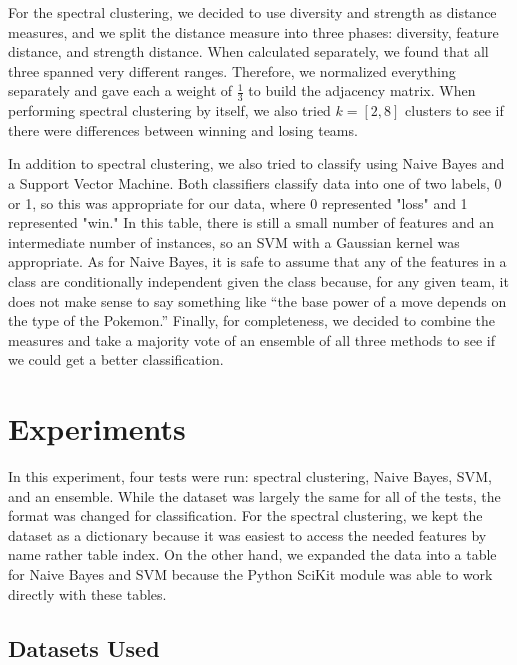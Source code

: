 \documentclass{acm_proc_article-sp}
\begin{document}
For the spectral clustering, we decided to use diversity and strength as distance measures, and we split the distance measure into three phases: diversity, feature distance, and strength distance. When calculated separately, we found that all three spanned very different ranges. Therefore, we normalized everything separately and gave each a weight of $\frac{1}{3}$ to build the adjacency matrix. When performing spectral clustering by itself, we also tried $k=[2, 8]$ clusters to see if there were differences between winning and losing teams.

In addition to spectral clustering, we also tried to classify using Naive Bayes and a Support Vector Machine. Both classifiers classify data into one of two labels, 0 or 1, so this was appropriate for our data, where 0 represented "loss" and 1 represented "win." In this table, there is still a small number of features and an intermediate number of instances, so an SVM with a Gaussian kernel was appropriate. As for Naive Bayes, it is safe to assume that any of the features in a class are conditionally independent given the class because, for any given team, it does not make sense to say something like “the base power of a move depends on the type of the Pokemon.” Finally, for completeness, we decided to combine the measures and take a majority vote of an ensemble of all three methods to see if we could get a better classification.

\section{Experiments}

In this experiment, four tests were run: spectral clustering, Naive Bayes, SVM, and an ensemble. While the dataset was largely the same for all of the tests, the format was changed for classification. For the spectral clustering, we kept the dataset as a dictionary because it was easiest to access the needed features by name rather table index. On the other hand, we expanded the data into a table for Naive Bayes and SVM because the Python SciKit module was able to work directly with these tables.

\subsection{Datasets Used}
\end{document}
